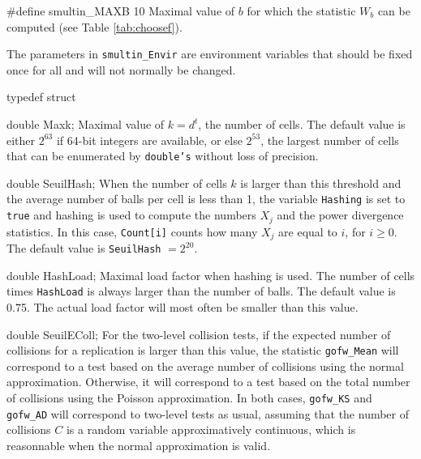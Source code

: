 #define smultin_MAXB  10
\endcode
\tab
  Maximal value of $b$ for which the statistic $W_b$
  can be computed (see Table \ref{tab:choosef}).
\endtab



The parameters in {\tt smultin\_Envir} are environment variables that
should be fixed once for all and will not normally be changed.

\code

typedef struct {

   double Maxk;
\endcode
\tabb
   Maximal value of $k = d^t$, the number of cells. The default value is
   either $2^{63}$ if 64-bit integers are available, or else $2^{53}$,
   the largest number of cells that can be enumerated by {\tt double's}
   without loss of precision.
\endtabb
\ifdetailed
\code

   double SeuilHash;
\endcode
\tabb
  When the number of cells $k$ is larger than this threshold and
  the average number of balls per cell is less than 1,
  the variable {\tt Hashing} is set to {\tt true} and
   hashing is used to compute the numbers $X_j$ and the power divergence
  statistics.
  In this case, {\tt Count[i]} counts how many $X_j$ are
  equal to $i$, for $i \ge 0$.
  The  default value is {\tt SeuilHash} $= 2^{20}$.
\endtabb
\code

   double HashLoad;
\endcode
\tabb
  Maximal load factor when  hashing is used. The number
  of cells times {\tt HashLoad} is always larger than the number
  of balls. The default value is 0.75. The actual load factor will
  most often be smaller than this value.
\endtabb
\code

   double SeuilEColl;
\endcode
\tabb
  For the two-level collision  tests, if the expected number of
  collisions for a replication is larger than this value, the statistic
  {\tt gofw\_Mean} will
  correspond to a test based on the average number of collisions
   using the  normal  approximation.  Otherwise, it will
  correspond to a  test  based on the total number of collisions
   using the  Poisson approximation.
  In both cases, {\tt gofw\_KS} and {\tt gofw\_AD} will
  correspond to  two-level tests as usual, assuming that the number
  of collisions
  $C$ is a random variable approximatively continuous, which is reasonnable
  when the normal approximation is valid.
\endtabb
\code

}
